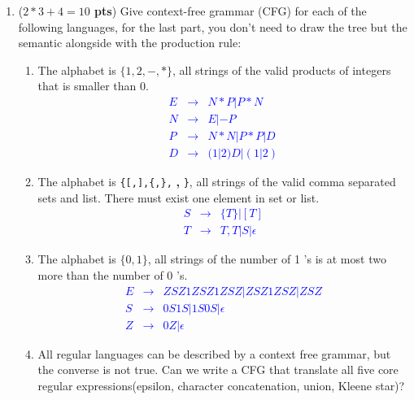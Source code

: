 \documentclass[10pt]{exam}
\newcommand {\pts}[1]{({\bf #1 pts})}
\begin{document}
\begin{enumerate}
  \item  \pts{$2*3+4 = 10$} Give context-free grammar (CFG) for each of the following languages, for the last
        part, you don't need to draw the tree but the semantic alongside with the production rule:
        \begin{enumerate}
          \item The alphabet is $\{1,2,-, *\}$, all strings of the valid products of integers that is smaller
                than 0.
                \textcolor{blue}{
                  \[\begin{array}{cll}
                      E & \rightarrow & N*P|P*N      \\
                      N & \rightarrow & E|-P         \\
                      P & \rightarrow & N*N|P*P|D    \\
                      D & \rightarrow & (1|2)D|(1|2)
                    \end{array}\]}
          \item The alphabet is \texttt{\{[,],\{,\},} \textbf{,} \texttt{\}}, all strings of the valid comma
                separated sets and list. There must exist one element in set or list.
                \textcolor{blue}{\[
                    \begin{array}{cll}
                      S & \rightarrow & \{T\}|[T]      \\
                      T & \rightarrow & T,T|S|\epsilon
                    \end{array}
                  \]}

          \item The alphabet is $\{0,1\}$, all strings of the number of 1 's is at most two more than the
                number of 0 's.
                \textcolor{blue}{\[
                    \begin{array}{cll}
                      E & \rightarrow & ZSZ1ZSZ1ZSZ|ZSZ1ZSZ|ZSZ \\
                      S & \rightarrow & 0S1S|1S0S|\epsilon      \\
                      Z & \rightarrow & 0Z|\epsilon
                    \end{array}
                  \]}
          \item All regular languages can be described by a context free grammar, but the converse is not true.
                Can we write a CFG that translate all five core regular expressions(epsilon, character concatenation, union,
                Kleene star)?


\end{enumerate}
\end{enumerate}
\end{document}
